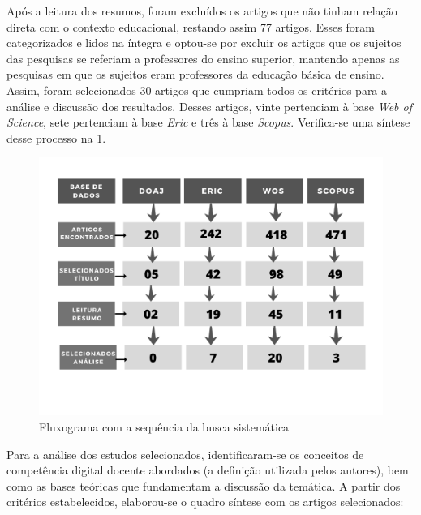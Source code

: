 \documentclass[portuguese]{textolivre}
\begin{document}
Após a leitura dos resumos, foram excluídos os artigos que não tinham
relação direta com o contexto educacional, restando assim 77 artigos.
Esses foram categorizados e lidos na íntegra e optou-se por excluir os
artigos que os sujeitos das pesquisas se referiam a professores do
ensino superior, mantendo apenas as pesquisas em que os sujeitos eram
professores da educação básica de ensino. Assim, foram selecionados 30
artigos que cumpriam todos os critérios para a análise e discussão dos
resultados. Desses artigos, vinte pertenciam à base \emph{Web of
Science}, sete pertenciam à base \emph{Eric }e três à base
\emph{Scopus}. Verifica-se uma síntese desse processo na \cref{fig01}.

\begin{figure}
    \centering
    \begin{minipage}{0.75\linewidth}
    \includegraphics[width=\linewidth]{figure01.png}
    \caption{Fluxograma com a sequência da busca sistemática}
    \label{fig01}
    \end{minipage}
\end{figure}

Para a análise dos estudos selecionados, identificaram-se os conceitos
de competência digital docente abordados (a definição utilizada pelos
autores), bem como as bases teóricas que fundamentam a discussão da
temática. A partir dos critérios estabelecidos, elaborou-se o quadro
síntese com os artigos selecionados:
\end{document}
